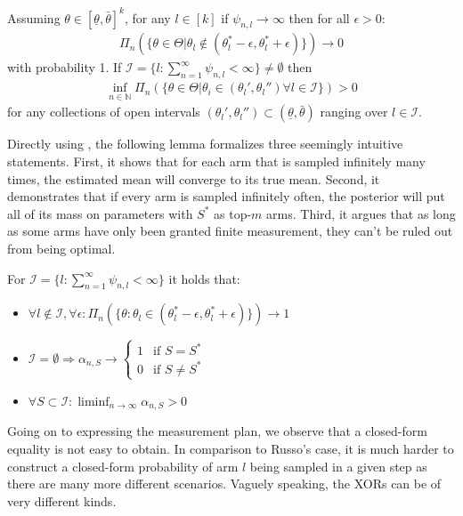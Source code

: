 \begin{proposition}\label{proposition:russo_4}
  Assuming $\theta \in [\underline{\theta}, \bar{\theta}]^k$, for any $l \in
      [k]$ if $\psi_{n, l} \rightarrow \infty$ then for all $\epsilon > 0$:
  \begin{align}
    \Pi_n(\{\theta \in \Theta | \theta_l \notin (\theta_l^* - \epsilon,
        \theta_l^* + \epsilon)\}) \rightarrow 0
  \end{align}
  with probability 1. If $\mathcal{I} = \{l: \sum_{n=1}^\infty \psi_{n, l} <
  \infty\} \neq \emptyset$ then
  \begin{align}
    \inf_{n \in \mathbb{N}} \Pi_n(\{\theta \in \Theta | \theta_i \in
        (\theta_l', \theta_l'') \forall l \in \mathcal{I}\}) > 0
  \end{align}
  for any collections of open intervals $(\theta_l', \theta_l'') \subset
  (\underline{\theta}, \bar{\theta})$ ranging over $l \in \mathcal{I}$.
\end{proposition}
Directly using , the following lemma formalizes three
seemingly intuitive statements. First, it shows that for each arm that is
sampled infinitely many times, the estimated mean will converge to its true
mean. Second, it demonstrates that if every arm is sampled infinitely often, the
posterior will put all of its mass on parameters with $S^*$ as top-$m$ arms.
Third, it argues that as long as some arms have only been granted finite
measurement, they can't be ruled out from being optimal.
\begin{lemma}\label{lemma:finite_measurement}
  For $\mathcal{I} = \{l: \sum_{n=1}^\infty \psi_{n, l} < \infty\}$ it holds
      that:
  \begin{itemize}
    \item $\forall l \notin \mathcal{I}, \forall \epsilon: \Pi_n(\{\theta:
        \theta_l \in (\theta^*_l - \epsilon, \theta^*_l + \epsilon)\})
        \rightarrow 1$
    \item $\mathcal{I} = \emptyset \Rightarrow
    \alpha_{n, S} \rightarrow \begin{cases}
      1 & \text{if } S = S^*\\
      0 & \text{if } S \neq S^*
    \end{cases}$
    \item $\forall S \subset \mathcal{I}: \liminf_{n \rightarrow \infty}
        \alpha_{n, S} > 0$
  \end{itemize}
\end{lemma}
Going on to expressing the measurement plan, we observe that a closed-form
equality is not easy to obtain. In comparison to Russo's case, it is much harder
to construct a closed-form probability of arm $l$ being sampled in a given step
as there are many more different scenarios. Vaguely speaking, the XORs can be of
very different kinds.

